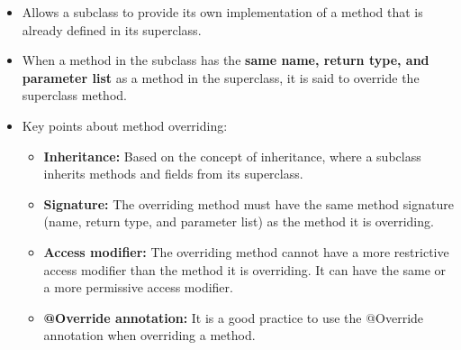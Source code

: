 \setlength{\columnsep}{3pt}
\begin{flushleft}
	
	\begin{itemize}
		\item Allows a subclass to provide its own implementation of a method that is already defined in its superclass. 
		\item When a method in the subclass has the \textbf{same name, return type, and parameter list} as a method in the superclass, it is said to override the superclass method.
		
		\item Key points about method overriding:
		
		\begin{itemize}
			\item \textbf{Inheritance:} Based on the concept of inheritance, where a subclass inherits methods and fields from its superclass.
			
			\item \textbf{Signature:} The overriding method must have the same method signature (name, return type, and parameter list) as the method it is overriding.
			
			\item \textbf{Access modifier:} The overriding method cannot have a more restrictive access modifier than the method it is overriding. It can have the same or a more permissive access modifier.
			
			\item \textbf{@Override annotation:} It is a good practice to use the @Override annotation when overriding a method.
			

\end{itemize}
\end{itemize}
\end{flushleft}
